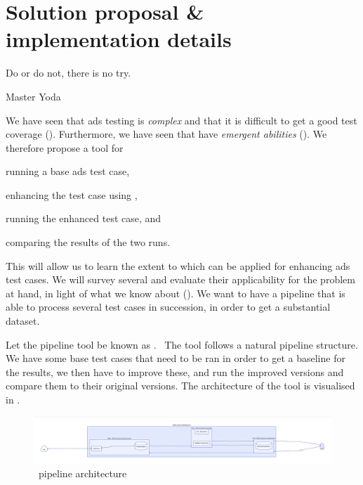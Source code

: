 \chapter{Solution proposal \& implementation details}\label{chp:solutionProposal}

\epigraph{Do or do not, there is no try.}{Master Yoda}

We have seen that \acrshort{ads} testing is \textit{complex} and that it is difficult to get a good
test coverage (). Furthermore, we have seen that 
have \textit{emergent abilities} (). We therefore propose a tool for
\begin{inparaenum}
    \item running a base \acrshort{ads} test case,
    \item enhancing the test case using ,
    \item running the enhanced test case, and
    \item comparing the results of the two runs.
\end{inparaenum}

This will allow us to learn the extent to which  can be applied for enhancing
\acrlong{ads} test cases. We will survey several  and evaluate their applicability
for the problem at hand, in light of what we know about  (). We
want to have a pipeline that is able to process several test cases in succession, in order to get a
substantial dataset.

Let the pipeline tool be known as \hefe.~%
The tool follows a natural pipeline structure. We have some base test cases that
need to be ran in order to get a baseline for the results, we then have to
improve these, and run the improved versions and compare them to their original
versions. The architecture of the tool is visualised in .

\begin{figure}[h]
    \centering
    \includegraphics[width=\textwidth]{figures/d2-pdf/hefe.pdf}
    \caption{\hefe~pipeline architecture}\label{fig:hefeArch}
\end{figure}



